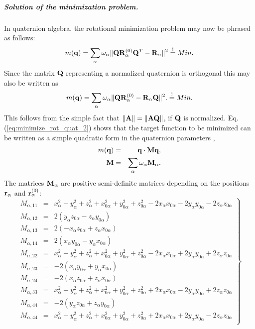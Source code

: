\documentclass[a4paper,11pt]{report}
\begin{document}
\subparagraph{Solution of the minimization problem.} In quaternion algebra, the rotational minimization problem may now be 
phrased as follows:
\begin{equation}
\label{eq:minimize_rot_quat_1}
m({\bf q}) = \sum_\alpha \omega_\alpha 
\|{\bf Q}{\bf R}^{(0)}_\alpha{\bf Q}^T - {\bf R}_\alpha\|^2
\stackrel{!}{=} Min.
\end{equation}
Since the matrix ${\bf Q}$ representing a normalized quaternion is orthogonal this may also be written as
\begin{equation}
\label{eq:minimize_rot_quat_2}
m({\bf q}) = \sum_\alpha \omega_\alpha 
\|{\bf Q}{\bf R}^{(0)}_\alpha - {\bf R}_\alpha{\bf Q}\|^2.
\stackrel{!}{=} Min.
\end{equation}
This follows from the simple fact that  $\|{\bf A}\| = \|{\bf A}{\bf Q}\|$, if ${\bf Q}$ is normalized. 
Eq. (\ref{eq:minimize_rot_quat_2}) shows that the target function to be minimized can be written as a simple quadratic 
form in the quaternion parameters \cite{Kneller:1991}, \begin{eqnarray}
\label{eq:quad_form}
m({\bf q}) &= &{\bf q}\cdot{\bf M}{\bf q},\\
{\bf M} &= &\sum_\alpha \omega_\alpha {\bf M}_\alpha.
\end{eqnarray}
The matrices ${\bf M}_\alpha$ are positive semi-definite matrices depending on the positions ${\bf r}_\alpha$ and 
${\bf r}^{(0)}_\alpha$:
\begin{equation}
\left.
\begin{array}{lll}
M_{\alpha,11} &= &
  x_\alpha^2 + y_\alpha^2 + z_\alpha^2 
+ x_{0\alpha}^2 + y_{0\alpha}^2 + z_{0\alpha}^2   
-2x_\alpha x_{0\alpha} -2y_\alpha y_{0\alpha} -2z_\alpha z_{0\alpha}
\\
M_{\alpha,12} &= &2(y_\alpha z_{0\alpha} - z_\alpha y_{0\alpha})\\
M_{\alpha,13} &= &2(-x_\alpha z_{0\alpha} + z_\alpha x_{0\alpha})\\
M_{\alpha,14} &= &2(x_\alpha y_{0\alpha} - y_\alpha x_{0\alpha})\\
M_{\alpha,22} &= &
  x_\alpha^2 + y_\alpha^2 + z_\alpha^2 
+ x_{0\alpha}^2 + y_{0\alpha}^2 + z_{0\alpha}^2   
-2x_\alpha x_{0\alpha} +2y_\alpha y_{0\alpha} +2z_\alpha z_{0\alpha}
\\
M_{\alpha,23} &= &-2(x_\alpha y_{0\alpha} + y_\alpha x_{0\alpha})\\
M_{\alpha,24} &= &-2(x_\alpha z_{0\alpha} + z_\alpha x_{0\alpha})\\
M_{\alpha,33} &= &
  x_\alpha^2 + y_\alpha^2 + z_\alpha^2 
+ x_{0\alpha}^2 + y_{0\alpha}^2 + z_{0\alpha}^2   
+2x_\alpha x_{0\alpha} -2y_\alpha y_{0\alpha} +2z_\alpha z_{0\alpha}
\\
M_{\alpha,44} &= &-2(y_\alpha z_{0\alpha} + z_\alpha y_{0\alpha})\\
M_{\alpha,44} &= &
  x_\alpha^2 + y_\alpha^2 + z_\alpha^2 
+ x_{0\alpha}^2 + y_{0\alpha}^2 + z_{0\alpha}^2   
+2x_\alpha x_{0\alpha} +2y_\alpha y_{0\alpha} -2z_\alpha z_{0\alpha}
\\
\end{array}
\right\}
\end{equation}
\end{document}
